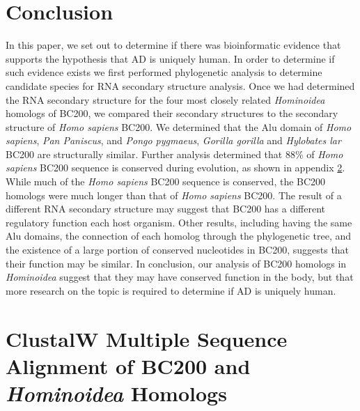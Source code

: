 \documentclass[conference, 11pt]{IEEEtran}
\begin{document}
\section{Conclusion}\label{sec:conclusion}

In this paper, we set out to determine if there was bioinformatic evidence that supports the hypothesis that AD is uniquely human. 
In order to determine if such evidence exists we first performed phylogenetic analysis to determine candidate species for RNA secondary structure analysis. 
Once we had determined the RNA secondary structure for the four most closely related \emph{Hominoidea} homologs of BC200, we compared their secondary structures to the secondary structure of \emph{Homo sapiens} BC200. 
We determined that the Alu domain of \emph{Homo sapiens}, \emph{Pan Paniscus}, and \emph{Pongo pygmaeus}, \emph{Gorilla gorilla} and \emph{Hylobates lar} BC200 are structurally similar. 
Further analysis determined that 88\% of \emph{Homo sapiens} BC200 sequence is conserved during evolution, as shown in appendix \ref{app:A}. 
While much of the \emph{Homo sapiens} BC200 sequence is conserved, the BC200 homologs were much longer than that of \emph{Homo sapiens} BC200.
The result of a different RNA secondary structure may suggest that BC200 has a different regulatory function each host organism.
Other results, including having the same Alu domains, the connection of each homolog through the phylogenetic tree, and the existence of a large portion of conserved nucleotides in BC200, suggests that their function may be similar. 
In conclusion, our analysis of BC200 homologs in \emph{Hominoidea} suggest that they may have conserved function in the body, but that more research on the topic is required to determine if AD is uniquely human.




\vspace{4cm}

\onecolumn
\appendices

\section{ClustalW Multiple Sequence Alignment of BC200 and \emph{Hominoidea} Homologs}
\label{app:A}
\end{document}
